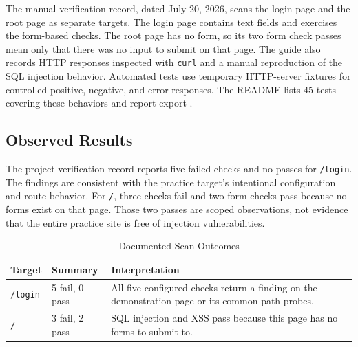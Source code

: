 \documentclass[conference]{IEEEtran}
\begin{document}
The manual verification record, dated July 20, 2026, scans the login page and
the root page as separate targets. The login page contains text fields and
exercises the form-based checks. The root page has no form, so its two form
check passes mean only that there was no input to submit on that page. The guide
also records HTTP responses inspected with \texttt{curl} and a manual
reproduction of the SQL injection behavior. Automated tests use temporary
HTTP-server fixtures for controlled positive, negative, and error responses.
The README lists 45 tests covering these behaviors and report export
\cite{projectReadme,manualVerification}.

\subsection{Observed Results}
The project verification record reports five failed checks and no passes for
\texttt{/login}. The findings are consistent with the practice target's
intentional configuration and route behavior. For \texttt{/}, three checks
fail and two form checks pass because no forms exist on that page. Those two
passes are scoped observations, not evidence that the entire practice site is
free of injection vulnerabilities.

\begin{table}[!t]
\caption{Documented Scan Outcomes}
\label{tab:results}
\centering
\footnotesize
\begin{tabular}{|p{}|p{}|p{}|}
\hline
\textbf{Target} & \textbf{Summary} & \textbf{Interpretation} \\
\hline
\texttt{/login} & 5 fail, 0 pass & All five configured checks return a finding on the demonstration page or its common-path probes. \\
\hline
\texttt{/} & 3 fail, 2 pass & SQL injection and XSS pass because this page has no forms to submit to. \\
\hline
\end{tabular}
\end{table}
\end{document}
